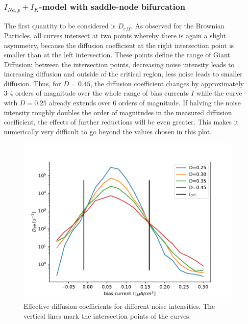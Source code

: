 \documentclass[12pt,a4paper]{article}
\begin{document}
\subsubsection{$I_{Na,p}+I_K$-model with saddle-node bifurcation}
The first quantity to be considered is $D_{eff}$.
As observed for the Brownian Particles, all curves intersect at two points whereby there is again a slight asymmetry, because the diffusion coefficient at the right intersection point is smaller than at the left intersection. These points define the range of Giant Diffusion: between the intersection points, decreasing noise intensity leads to increasing diffusion and outside of the critical region, less noise leads to smaller diffusion. Thus, for $D=0.45$, the diffusion coefficient changes by approximately 3-4 orders of magnitude over the whole range of bias currents $I$ while the curve with $D=0.25$ already extends over 6 orders of magnitude. If halving the noise intensity roughly doubles the order of magnitudes in the measured diffusion coefficient, the effects of further reductions will be even greater. This makes it numerically very difficult to go beyond the values chosen in this plot.
\begin{figure}[H]
	\centering
	\includegraphics[scale=1]{dneur25critsprealfast16alcoarsewstfrealfast9acoarsetf.pdf}\caption{Effective diffusion coefficients for different noise intensities. The vertical lines mark the intersection points of the curves.}%
	\label{deff}
\end{figure}
\end{document}
